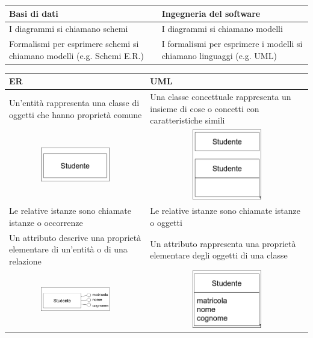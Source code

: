 \documentclass{article}
\begin{document}
\begin{center}
    \begin{tabular}{p{}|p{}}
        Basi di dati & Ingegneria del software\\
        \hline
        I diagrammi si chiamano schemi & I diagrammi si chiamano modelli\\
        Formalismi per esprimere schemi si chiamano modelli (e.g. Schemi E.R.) & I formalismi per esprimere i modelli si chiamano linguaggi (e.g. UML)
    \end{tabular}
    \begin{tabular}{p{}|p{}}
        ER & UML\\
        \hline
        Un'entità rappresenta una classe di oggetti che hanno proprietà comune & Una classe concettuale rappresenta un insieme di cose o concetti con caratteristiche simili\\
        \multicolumn{1}{c|}{\includegraphics[width=3cm]{images/er.png}} & \multicolumn{1}{c}{\includegraphics[width=3cm]{images/uml.png}}\\
        Le relative istanze sono chiamate istanze o occorrenze & Le relative istanze sono chiamate istanze o oggetti\\
        Un attributo descrive una proprietà elementare di un'entità o di una relazione & Un attributo rappresenta una proprietà elementare degli oggetti di una classe\\
        \multicolumn{1}{c|}{\includegraphics[width=3cm]{images/er2.png}} & \multicolumn{1}{c}{\includegraphics[width=3cm]{images/uml2.png}}\\

\end{tabular}
\end{center}
\end{document}

